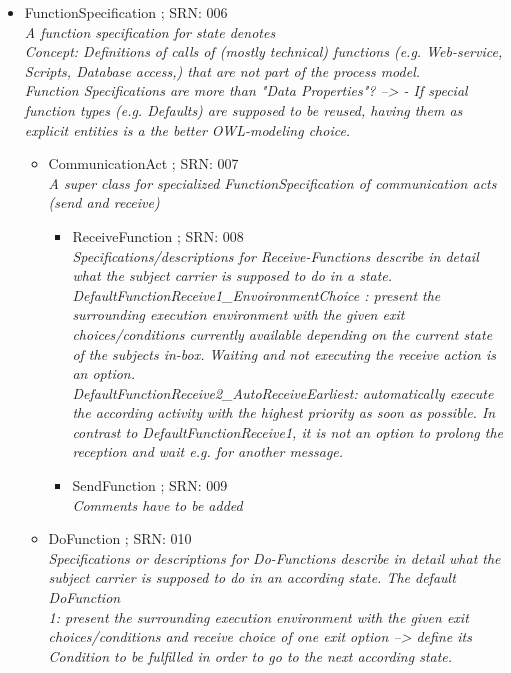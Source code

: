 \begin{itemize}
\begin{itemize}
\begin{itemize}
\begin{itemize}
			\end{itemize}
			\item FunctionSpecification ; SRN: 006 \\ \textit{A function specification for state denotes \\ 
				Concept: Definitions of calls of (mostly technical) functions (e.g. Web-service, Scripts, Database access,) that are not part of the process model.\\
				Function Specifications are more than "Data Properties"? --> - If special function types (e.g. Defaults) are supposed to be reused, having them as explicit entities is a the better OWL-modeling choice.}
			\begin{itemize}
				\item CommunicationAct ; SRN: 007 \\ \textit{A super class for specialized FunctionSpecification of communication acts (send and receive)}
				\begin{itemize}
					\item ReceiveFunction ; SRN: 008 \\ \textit{Specifications/descriptions for Receive-Functions describe in detail what the subject carrier is supposed to do in a state.\\
						DefaultFunctionReceive1\_EnvoironmentChoice : present the surrounding execution environment with the given exit choices/conditions currently available depending on the current state of the subjects in-box. Waiting and not executing the receive action is an option.\\
						DefaultFunctionReceive2\_AutoReceiveEarliest: automatically execute the according activity with the highest priority as soon as possible. In contrast to DefaultFunctionReceive1, it is not an option to prolong the reception and wait e.g. for another message.}
					\item SendFunction ; SRN: 009 \\ \textit{Comments have to be added}
				\end{itemize}
				\item DoFunction ; SRN: 010 \\ \textit{Specifications or descriptions for Do-Functions describe in detail what the subject carrier is supposed to do in an according state.
					The default DoFunction\\ 1: present the surrounding execution environment with the given exit choices/conditions and receive choice of one exit option --> define its Condition to be fulfilled in order to go to the next according state.
}
\end{itemize}
\end{itemize}
\end{itemize}
\end{itemize}

